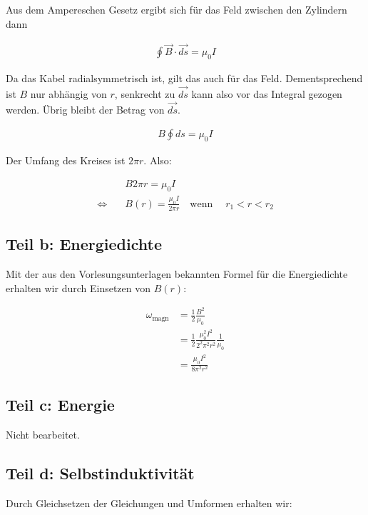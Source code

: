 \documentclass[a4paper,german,12pt,smallheadings]{scrartcl}
\begin{document}
Aus dem Ampereschen Gesetz ergibt sich für das Feld zwischen den Zylindern dann

\begin{align*}
  \oint \vec{B} \cdot \vec{ds} = \mu_0 I
\end{align*}

Da das Kabel radialsymmetrisch ist, gilt das auch für das Feld. Dementsprechend
ist $B$ nur abhängig von $r$, senkrecht zu $\vec{ds}$ kann also vor das
Integral gezogen werden. Übrig bleibt der Betrag von $\vec{ds}$.

\begin{align*}
  B \oint ds = \mu_0 I
\end{align*}

Der Umfang des Kreises ist $2 \pi r$. Also:

\begin{align*}
  &B 2 \pi r = \mu_0 I \\
  \Leftrightarrow\quad &B(r) = \frac{\mu_0 I}{2 \pi r} \quad \text{wenn}\quad\; r_1 < r < r_2
\end{align*}

\subsection*{Teil b: Energiedichte}

Mit der aus den Vorlesungsunterlagen bekannten Formel für die Energiedichte
erhalten wir durch Einsetzen von $B(r)$:

\begin{align*}
  \omega_{\text{magn}} &= \frac{1}{2} \frac{B^2}{\mu_0} \\
                       &= \frac{1}{2} \frac{\mu_0^2 I^2}{2^2 \pi^2 r^2} \frac{1}{\mu_0} \\
                       &= \frac{\mu_0 I^2}{8 \pi^2 r^2}
\end{align*}

\subsection*{Teil c: Energie}

Nicht bearbeitet.

\subsection*{Teil d: Selbstinduktivität}

Durch Gleichsetzen der Gleichungen und Umformen erhalten wir:
\end{document}
